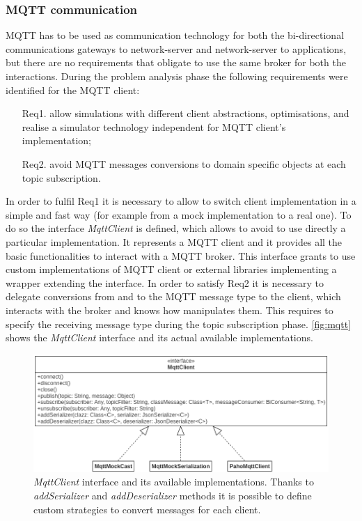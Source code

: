 \subsubsection{MQTT communication}
MQTT has to be used as communication technology for both the bi-directional communications gateways to network-server and network-server to applications, but there are no requirements that obligate to use the same broker for both the interactions. 
During the problem analysis phase the following requirements were identified for the MQTT client:
\begin{itemize}
    \item[Req1.] allow simulations with different client abstractions, optimisations, and realise a simulator technology independent for MQTT client's implementation;
    \item[Req2.] avoid MQTT messages conversions to domain specific objects at each topic \mbox{subscription}.
\end{itemize}
In order to fulfil Req1 it is necessary to allow to switch client implementation in a simple and fast way (for example from a mock implementation to a real one).
To do so the interface \mbox{\textit{MqttClient}} is defined, which allows to avoid to use directly a particular implementation.
It represents a MQTT client and it provides all the basic functionalities to interact with a MQTT broker. 
This interface grants to use custom implementations of MQTT client or external libraries implementing a wrapper extending the interface.
% 
In order to satisfy Req2 it is necessary to delegate conversions from and to the MQTT message type to the client, which interacts with the broker and knows how manipulates them.
% 
This requires to specify the receiving message type during the topic subscription phase.
% 
\autoref{fig:mqtt} shows the \mbox{\textit{MqttClient}} interface and its actual available implementations.
\begin{figure}[h]
    \centering
    \includegraphics[width=\textwidth]{figures/mqttClient.png}
    \caption[\textit{MqttClient} interface and its available implementations]{\textit{MqttClient} interface and its available implementations. Thanks to \mbox{\textit{addSerializer}} and \mbox{\textit{addDeserializer}} methods it is possible to define custom strategies to convert messages for each client.}
    \label{fig:mqtt}
\end{figure}

